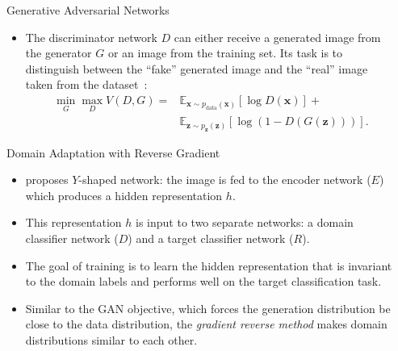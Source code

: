 \documentclass[final]{beamer}
\newlength{\sepwid}
\newlength{\onecolwid}
\begin{document}
\begin{frame}[t]
\begin{columns}[t]
\begin{column}{\onecolwid}
\begin{block}{Generative Adversarial Networks}
\begin{itemize}
        \item The discriminator network $D$
    can either receive a generated image from the generator $G$ or an image
    from the training set. Its task is to distinguish
    between the ``fake'' generated image and the ``real'' image taken from the dataset~\cite{goodfellow2014generative}:
    \begin{align*}
        \min_G \max_D V(D, G) = & \mathbb{E}_{\bm{x} \sim p_{\text{data}}(\bm{x})}[\log D(\bm{x})] + \\
            & \mathbb{E}_{\bm{z} \sim p_{\bm{z}}(\bm{z})}[\log (1 - D(G(\bm{z})))].
    \end{align*}

    \end{itemize}


    \begin{block}{Domain Adaptation with Reverse Gradient}
        \begin{itemize}
            \item \cite{ganin2014unsupervised} proposes $Y$-shaped network: the image is fed to the
            encoder network ($E$) which produces a hidden representation $h$. 
            
            \item This representation $h$ is input to two separate networks: a domain classifier network ($D$) and 
            a target classifier network ($R$). 
            
            \item The goal of training is to learn the hidden 
            representation that is invariant to the domain labels and performs well on the target classification 
            task. 
            
            \item Similar to the GAN objective, which forces the generation distribution be close to the data distribution,
            the \emph{gradient reverse method} makes domain distributions similar to each other.
        \end{itemize}
        
    \end{block}
\end{block}

\end{column} %

\begin{column}{\sepwid}\end{column} %


\end{columns}
\end{frame}
\end{document}
